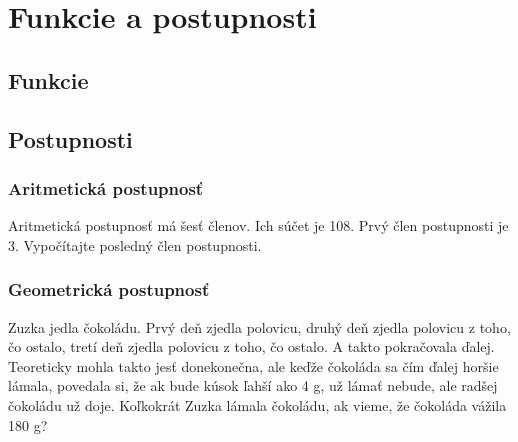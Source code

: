 \chapter{Funkcie a postupnosti}

\section{Funkcie}

\section{Postupnosti}

\subsection{Aritmetická postupnosť}

\begin{example}
	Aritmetická postupnosť má šesť členov. Ich súčet je 108. Prvý člen postupnosti je 3. Vypočítajte posledný člen postupnosti.
\end{example}

\subsection{Geometrická postupnosť}

\begin{example}
	Zuzka jedla čokoládu. Prvý deň zjedla polovicu, druhý deň zjedla polovicu z toho, čo	ostalo, tretí deň zjedla polovicu z toho, čo ostalo. A takto pokračovala ďalej. Teoreticky mohla takto jesť donekonečna, ale keďže čokoláda sa čím ďalej horšie lámala, povedala si, že ak bude kúsok ľahší ako 4 g, už lámať nebude, ale radšej čokoládu už doje. Koľkokrát Zuzka lámala čokoládu, ak vieme, že čokoláda vážila 180 g?
\end{example}